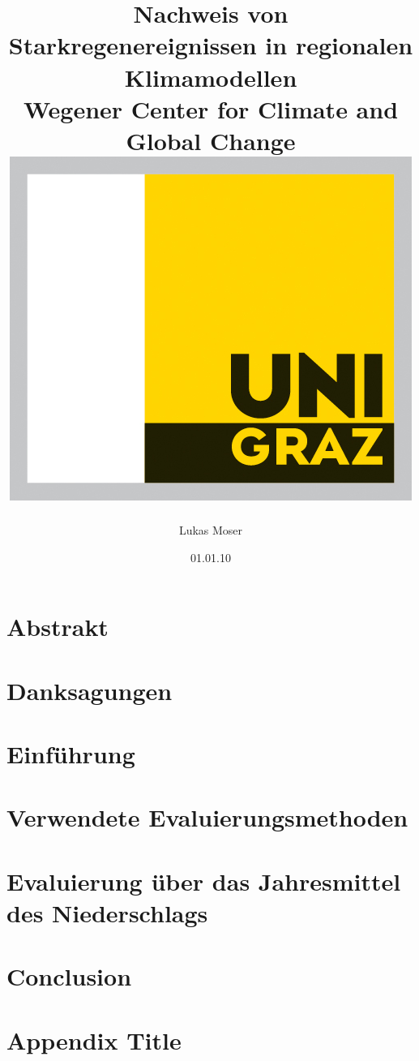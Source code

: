 \documentclass[12pt,twoside]{report}
\title{
	{Nachweis von Starkregenereignissen in regionalen Klimamodellen}\\
	{\large Wegener Center for Climate and Global Change}\\
	{\includegraphics{university.jpg}}
}
\author{Lukas Moser}
\date{01.01.10}
\begin{document}
	\maketitle
	\pagestyle{fancy}
	
	\chapter*{Abstrakt}
	
	
	\chapter*{Danksagungen}
	
	\tableofcontents
	
	\chapter{Einführung}
	\label{chap:intro}
	
	
	\chapter{Verwendete Evaluierungsmethoden}
	\label{chap:methods}
	
	
	\chapter{Evaluierung über das Jahresmittel des Niederschlags}
	\label{chap:mean}
	
	
	
	\chapter{Conclusion}
	\label{chap:conclusion}
	
	
	\appendix
	\chapter{Appendix Title}
	
	\printbibliography
\end{document}
